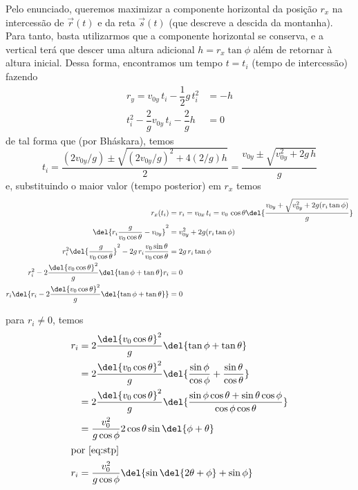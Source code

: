 \documentclass[]{IMTexam}
\begin{document}
\begin{questions}
\begin{solution}
		Pelo enunciado, queremos maximizar a componente horizontal da posição $ r_x $ na intercessão de $ \vec{r}(t) $ e da reta $ \vec{s}(t) $ (que descreve a descida da montanha). Para tanto, basta utilizarmos que a componente horizontal se conserva, e a vertical terá que descer uma altura adicional $ h=r_x\tan\phi $ além de retornar à altura inicial. Dessa forma, encontramos um tempo $ t=t_i $ (tempo de intercessão) fazendo
		\begin{align*}
			r_y=v_{0y}\,t_i-\dfrac{1}{2}g\,t_i^{2}        & =-h \\
			t_i^{2}-\dfrac{2}{g}v_{0y}\,t_i-\dfrac{2}{g}h & =0
		\end{align*}
		de tal forma que (por Bháskara), temos
		\[ t_i=\dfrac{(2v_{0y}/g)\pm\sqrt{(2v_{0y}/g)^{2}+4(2/g)h}}{2}=\dfrac{v_{0y}\pm\sqrt{v_{0y}^{2}+2g\,h}}{g} \]
		e, substituindo o maior valor (tempo posterior) em $ r_x $ temos
		\begin{align*}
			r_x(t_i)                                                                                & =r_{i}=v_{0x}\,t_i=v_0\,\cos\theta\del{\dfrac{v_{0y}+\sqrt{v_{0y}^{2}+2g(r_i\tan\phi)}}{g}} \\
			\del{r_i\dfrac{g}{v_0\cos\theta}-v_{0y}}^{2}                                            & =v_{0y}^{2}+2g(r_i\tan\phi)                                                                 \\
			r_i^{2}\del{\dfrac{g}{v_0\cos\theta}}^{2}-2g\,r_i\dfrac{v_{0}\sin\theta}{v_0\cos\theta} & =2g\,r_i\tan\phi                                                                            \\
			r_i^{2}-2\dfrac{\del{v_0\cos\theta}^{2}}{g}\del{\tan\phi+\tan\theta}r_i                 & =0                                                                                          \\
			r_i\del{r_i-2\dfrac{\del{v_0\cos\theta}^{2}}{g}\del{\tan\phi+\tan\theta}}               & =0
		\end{align*}
		\begin{multi}[2][t]
			para $ r_i\neq0 $, temos
			\begin{align*}
				r_i & =2\dfrac{\del{v_0\cos\theta}^{2}}{g}\del{\tan\phi+\tan\theta}                                               \\
				    & =2\dfrac{\del{v_0\cos\theta}^{2}}{g}\del{\dfrac{\sin\phi}{\cos\phi}+\dfrac{\sin\theta}{\cos\theta}}         \\
				    & =2\dfrac{\del{v_0\cos\theta}^{2}}{g}\del{\dfrac{\sin\phi\cos\theta+\sin\theta\cos\phi}{\cos\phi\cos\theta}} \\
				    & =\dfrac{v_0^{2}}{g\cos\phi}2\cos\theta\sin\del{\phi+\theta}                                                 \\
				\intertext{por \ref{eq:stp}}
				r_i & =\dfrac{v_0^{2}}{g\cos\phi}\del{\sin\del{2\theta+\phi}+\sin\phi}
			\end{align*}


\end{multi}
\end{solution}
\end{questions}
\end{document}
